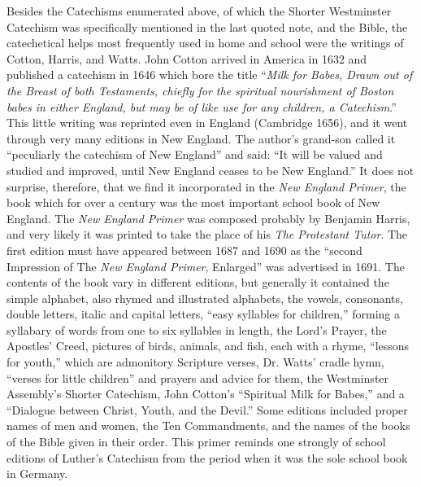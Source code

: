 Besides the Catechisms enumerated above, of which the Shorter Westminster Catechism was specifically mentioned in the last quoted note, and the Bible, the catechetical helps most frequently used in home and school were the writings of Cotton, Harris, and Watts. John Cotton arrived in America in 1632 and published a catechism in 1646 which bore the
title “\emph{Milk for Babes, Drawn out of the Breast of both Testaments, chiefly for the spiritual nourishment of Boston babes in either England, but may be of like use for any children, a Catechism}.” This little writing was reprinted even in England (Cambridge 1656), and it went through very many editions in New England. The author’s grand-son called it “peculiarly the catechism of New England” and said: “It will be valued and studied and improved, until New England ceases to be New England.” It does not surprise, therefore, that we find it incorporated in the \emph{\emph{New England Primer}}, the book which for over a century was the most important school book of New England. The \emph{\emph{New England Primer}} was composed probably by Benjamin Harris, and very likely it was printed to take the place of his \emph{The Protestant Tutor}. The first edition must have appeared between 1687 and 1690 as the “second Impression of The \emph{\emph{New England Primer}}, Enlarged” was advertised in 1691. The contents of the book vary in different editions, but generally it contained the simple alphabet, also rhymed and illustrated alphabets, the vowels, consonants, double letters, italic and capital letters, “easy syllables for children,” forming a syllabary of words from one to six syllables in length, the Lord’s Prayer, the Apostles’ Creed, pictures of birds, animals, and fish, each with a rhyme, “lessons for youth,” which are admonitory Scripture verses, Dr. Watts’ cradle hymn, “verses for little children” and prayers and advice for them, the Westminster Assembly’s Shorter Catechism, John Cotton’s “Spiritual Milk for Babes,” and a “Dialogue between Christ, Youth, and the Devil.” Some editions included proper names of men and women, the Ten Commandments, and the names of the books of the Bible given in their order. This primer reminds one strongly of school editions of Luther’s Catechism from the period when it was the sole school book in Germany.

